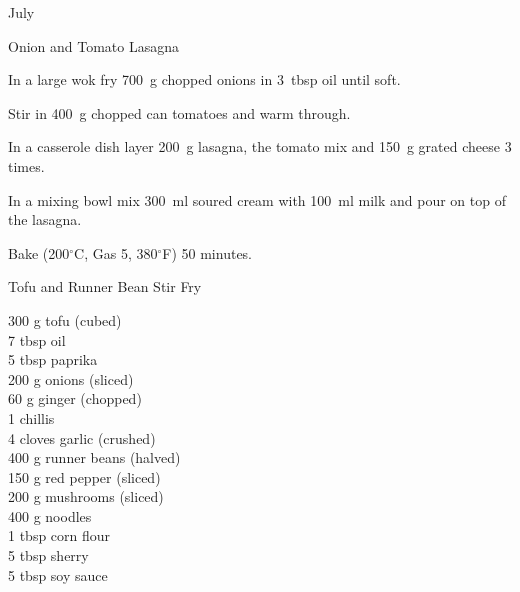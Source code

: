 \begin{menu}{July}
\begin{recipe}{2}{Onion and Tomato Lasagna}
\begin{ingredients}
		\end{ingredients}
	
	
    \begin{instructions}
    \item 
        In a large wok fry
        700~g chopped onions
        in
        3~tbsp  oil
        until soft.
      \item 
        Stir in 400~g chopped can tomatoes
        and warm through.
      \item 
        In a casserole dish layer
        200~g  lasagna,
        the tomato mix and
        150~g grated cheese
        3 times.
      \item 
        In a mixing bowl mix
        300~ml  soured cream
        with
        100~ml  milk
        and pour on top of the lasagna.
      \item 
        Bake (200$^{\circ}$C, Gas 5, 380$^{\circ}$F) 50 minutes.
      
    \end{instructions}
    \end{recipe}%
  
    \begin{recipe}{2}{Tofu and Runner Bean Stir Fry}%
		\begin{ingredients}
		300 g tofu (cubed) \\
	7 tbsp oil  \\
	5 tbsp paprika  \\
	200 g onions (sliced) \\
	60 g ginger (chopped) \\
	1  chillis  \\
	4 cloves garlic (crushed) \\
	400 g runner beans (halved) \\
	150 g red pepper (sliced) \\
	200 g mushrooms (sliced) \\
	400 g noodles  \\
	1 tbsp corn flour  \\
	5 tbsp sherry  \\
	5 tbsp soy sauce  \\
	
		\end{ingredients}
	
	

\end{recipe}
\end{menu}
